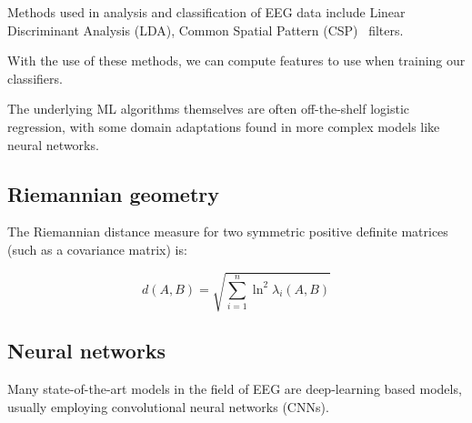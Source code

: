     Methods used in analysis and classification of EEG data include Linear Discriminant Analysis (LDA), Common Spatial Pattern (CSP)~\cite{barachant_common_2010} filters.

    With the use of these methods, we can compute features to use when training our classifiers.

    The underlying ML algorithms themselves are often off-the-shelf logistic regression, with some domain adaptations found in more complex models like neural networks.


    \subsection{Riemannian geometry}\label{section:riemannian-theory}


        The Riemannian distance measure for two symmetric positive definite matrices (such as a covariance matrix) is:~\cite{grafarend_metric_2003}

        \[ d(A, B) = \sqrt{\sum_{i=1}^{n} \ln^2 \lambda_i (A, B) } \]

    \subsection{Neural networks}

        Many state-of-the-art models in the field of EEG are deep-learning based models, usually employing convolutional neural networks (CNNs).
